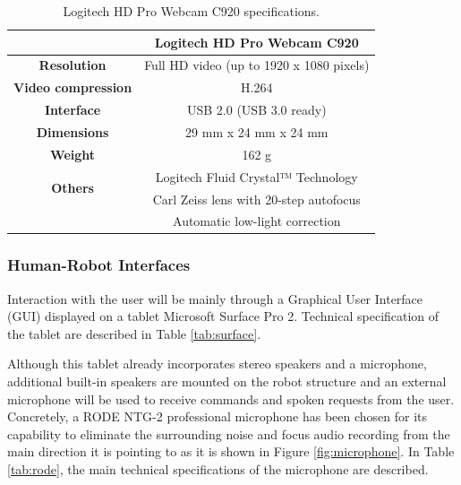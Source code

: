 \begin{table}[h!]
\begin{center}
\begin{tabular}{|c|c|}
\hline
& \bf{Logitech HD Pro Webcam C920} \\
\hline \bf{Resolution } & Full HD video (up to 1920 x 1080 pixels) \\
\hline \bf{Video compression } & H.264 \\ 
\hline \bf{Interface } & USB 2.0 (USB 3.0 ready) \\
\hline \bf{Dimensions } & 29 mm x 24 mm x 24 mm \\ 
\hline \bf{Weight } & 162 g \\
\hline \multirow{2}{*}{\bf{Others}}
& Logitech Fluid Crystal™ Technology \\
& Carl Zeiss lens with 20-step autofocus \\
& Automatic low-light correction \\
\hline
\end{tabular}
\end{center}
\caption{Logitech HD Pro Webcam C920 specifications.}
\label{tab:logitech}
\end{table}

\subsubsection{Human-Robot Interfaces}
Interaction with the user will be mainly through a Graphical User
Interface (GUI) displayed on a tablet Microsoft Surface Pro 2.
Technical specification of the tablet are described in Table \ref{tab:surface}.

Although this tablet already incorporates stereo speakers and a
microphone, additional built-in speakers are mounted on the robot
structure and an external microphone will be used to receive commands
and spoken requests from the user. Concretely, a RODE NTG-2
professional microphone has been chosen for its capability to
eliminate the surrounding noise and focus audio recording from the main direction it is pointing to as it is shown in Figure \ref{fig:microphone}.
In Table \ref{tab:rode}, the main technical specifications of the microphone are described.

